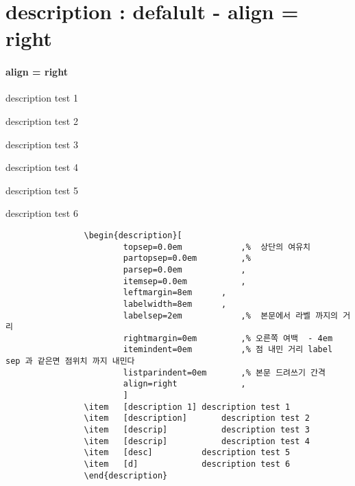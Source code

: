 	\section{description : defalult - align = right}
			\paragraph{ align = right }
				\begin{description}[
						topsep=0.0em 			,%
						partopsep=0.0em 		,%
						parsep=0.0em 			, 
						itemsep=0.0em 			, 
						leftmargin=8em 		,
						labelwidth=8em 		, 
						labelsep=2em 			,%
						rightmargin=0em 		,%
						itemindent=0em 			,%
						listparindent=0em 		,%
						align=right				,
						]
				\item	[description 1]	description test 1
				\item	[description]		description test 2
				\item	[descrip]			description test 3
				\item	[descrip]			description test 4
				\item	[desc]			description test 5
				\item	[d]				description test 6
				\end{description}

		\begin{mdframed}[style=code_document, frametitle={code}]
			\begin{verbatim}
				\begin{description}[
						topsep=0.0em 			,%  상단의 여유치
						partopsep=0.0em 		,%  
						parsep=0.0em 			, 
						itemsep=0.0em 			, 
						leftmargin=8em 		,
						labelwidth=8em 		, 
						labelsep=2em 			,%  본문에서 라벨 까지의 거리
						rightmargin=0em 		,% 오른쪽 여백  - 4em
						itemindent=0em 			,% 점 내민 거리 label sep 과 같은면 점위치 까지 내민다
						listparindent=0em 		,% 본문 드려쓰기 간격
						align=right				,
						]
				\item	[description 1]	description test 1
				\item	[description]		description test 2
				\item	[descrip]			description test 3
				\item	[descrip]			description test 4
				\item	[desc]			description test 5
				\item	[d]				description test 6
				\end{description}
			\end{verbatim}
		\end{mdframed}





